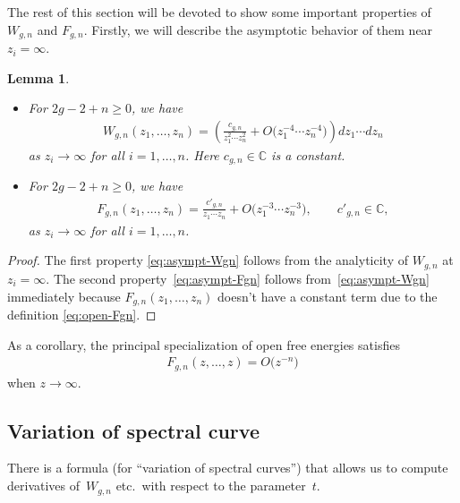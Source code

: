 \documentclass[11pt]{article}
\newtheorem{lem}[thm]{Lemma}
\theoremstyle{definition}
\numberwithin{equation}{section}
\def\bbC{{\mathbb C}}
\begin{document}
The rest of this section will be devoted to
show some important properties of $W_{g,n}$ and $F_{g,n}$.
Firstly, we will describe the asymptotic behavior
of them near $z_{i} = \infty$.

\begin{lem} \label{lem:decay-Wgn-Fgn}\quad
\begin{itemize}\itemsep=0pt
\item[$(i)$]
For $2g-2+n \ge 0$, we have
\begin{gather} \label{eq:asympt-Wgn}
W_{g,n}(z_{1},\dots,z_{n}) =
\left(\frac{c_{g,n}}{z_{1}^{2}\cdots z_{n}^{2}}
+ O\big(z_{1}^{-4}\cdots z_{n}^{-4}\big) \right)dz_{1}\cdots dz_{n}
\end{gather}
as $z_{i} \rightarrow \infty$ for all $i=1,\dots,n$.
Here $c_{g,n} \in \bbC$ is a constant.
\item[$(ii)$] %
For $2g-2+n \ge 0$, we have
\begin{gather} \label{eq:asympt-Fgn}
F_{g,n}(z_{1},\dots,z_{n}) =
\frac{c'_{g,n}}{z_{1}\cdots z_{n}} +
O\big(z_{1}^{-3}\cdots z_{n}^{-3}\big), \qquad
c'_{g,n} \in \bbC,
\end{gather}
as $z_{i} \rightarrow \infty$ for all $i=1,\dots,n$.
\end{itemize}
\end{lem}

\begin{proof}
The f\/irst property \eqref{eq:asympt-Wgn} follows from the
analyticity of $W_{g,n}$ at $z_i = \infty$.
The second property~\eqref{eq:asympt-Fgn} follows
from~\eqref{eq:asympt-Wgn} immediately
because $F_{g,n}(z_{1},\dots,z_{n})$ doesn't have
a constant term due to the def\/inition \eqref{eq:open-Fgn}.
\end{proof}

As a corollary, the principal specialization
of open free energies satisf\/ies
\begin{gather} \label{eq:decay-of-Fgn-prin}
F_{g,n}(z,\dots,z) = O\big(z^{-n}\big)
\end{gather}
when $z \rightarrow \infty$.

\subsection{Variation of spectral curve}
\label{section:variation-formula}

There is a formula (for ``variation of spectral curves'')
that allows us to compute derivatives of~$W_{g,n}$ etc.\
with respect to the parameter~$t$.
\end{document}
